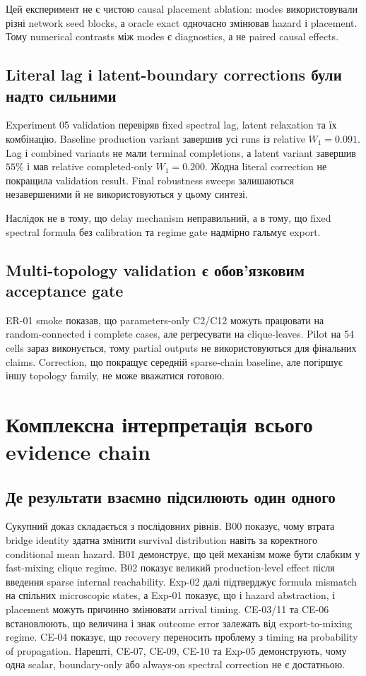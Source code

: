 \documentclass[11pt,a4paper]{article}
\begin{document}
Цей експеримент не є чистою causal placement ablation: modes використовували
різні network seed blocks, а oracle exact одночасно змінював hazard і placement.
Тому numerical contrasts між modes є diagnostics, а не paired causal effects.

\subsection{Literal lag і latent-boundary corrections були надто сильними}

Experiment 05 validation перевіряв fixed spectral lag, latent relaxation та
їх комбінацію. Baseline production variant завершив усі runs із relative
$W_1=0.091$. Lag і combined variants не мали terminal completions, а latent
variant завершив $55\%$ і мав relative completed-only $W_1=0.200$. Жодна
literal correction не покращила validation result. Final robustness sweeps
залишаються незавершеними й не використовуються у цьому синтезі.

Наслідок не в тому, що delay mechanism неправильний, а в тому, що fixed
spectral formula без calibration та regime gate надмірно гальмує export.

\subsection{Multi-topology validation є обов'язковим acceptance gate}

ER-01 smoke показав, що parameters-only C2/C12 можуть працювати на
random-connected і complete cases, але регресувати на clique-leaves. Pilot
на 54 cells зараз виконується, тому partial outputs не використовуються для
фінальних claims. Correction, що покращує середній sparse-chain baseline, але
погіршує іншу topology family, не може вважатися готовою.

\section{Комплексна інтерпретація всього evidence chain}

\subsection{Де результати взаємно підсилюють один одного}

Сукупний доказ складається з послідовних рівнів. B00 показує, чому втрата
bridge identity здатна змінити survival distribution навіть за коректного
conditional mean hazard. B01 демонструє, що цей механізм може бути слабким у
fast-mixing clique regime. B02 показує великий production-level effect після
введення sparse internal reachability. Exp-02 далі підтверджує formula mismatch
на спільних microscopic states, а Exp-01 показує, що і hazard abstraction, і
placement можуть причинно змінювати arrival timing. CE-03/11 та CE-06 встановлюють,
що величина і знак outcome error залежать від export-to-mixing regime. CE-04
показує, що recovery переносить проблему з timing на probability of propagation.
Нарешті, CE-07, CE-09, CE-10 та Exp-05 демонструють, чому одна scalar,
boundary-only або always-on spectral correction не є достатньою.
\end{document}
